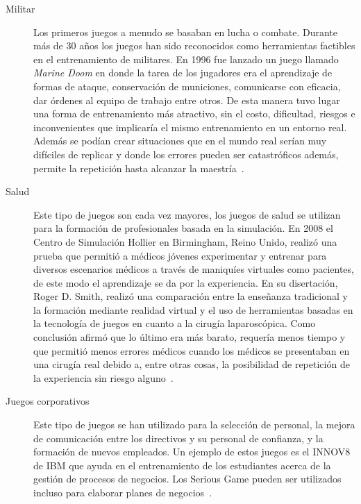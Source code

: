 \begin{description}

\item[Militar] Los primeros juegos a menudo se basaban en lucha o combate.
	Durante más de 30 años los juegos han sido reconocidos como herramientas
	factibles en el entrenamiento de militares. En 1996 fue lanzado un juego
	llamado \emph{Marine Doom} en donde la tarea de los jugadores era el
	aprendizaje de formas de ataque, conservación de municiones, comunicarse
	con eficacia, dar órdenes al equipo de trabajo entre otros. De esta
	manera tuvo lugar una forma de entrenamiento más atractivo, sin el
	costo, dificultad, riesgos e inconvenientes que implicaría el mismo
	entrenamiento en un entorno real. Además se podían crear situaciones que
	en el mundo real serían muy difíciles de replicar y donde los errores
	pueden ser catastróficos además, permite la repetición hasta alcanzar la
	maestría~\cite{education:games}.


\item[Salud] Este tipo de juegos son cada vez mayores, los juegos de salud se
	utilizan para la formación de profesionales basada en la simulación. En
	2008 el Centro de Simulación Hollier en Birmingham, Reino Unido, realizó
	una prueba que permitió a médicos jóvenes experimentar y entrenar para
	diversos escenarios médicos a través de maniquíes virtuales como
	pacientes, de este modo el aprendizaje se da por la experiencia. En su
	disertación, Roger D. Smith, realizó una comparación entre la enseñanza
	tradicional y la formación mediante realidad virtual y el uso de
	herramientas basadas en la tecnología de juegos en cuanto a la cirugía
	laparoscópica. Como conclusión afirmó que lo último era más barato,
	requería menos tiempo y que permitió menos errores médicos cuando los
	médicos se presentaban en una cirugía real debido a, entre otras cosas,
	la posibilidad de repetición de la experiencia sin riesgo
	alguno~\cite{education:games}.



\item[Juegos corporativos] Este tipo de juegos se han utilizado para la
	selección de personal, la mejora de comunicación entre los directivos y
	su personal de confianza, y la formación de nuevos empleados. Un ejemplo
	de estos juegos es el INNOV8 de IBM que ayuda en el entrenamiento de los
	estudiantes acerca de la gestión de procesos de negocios. Los Serious
	Game pueden ser utilizados incluso para elaborar planes de
	negocios~\cite{education:games}. 

\end{description}

